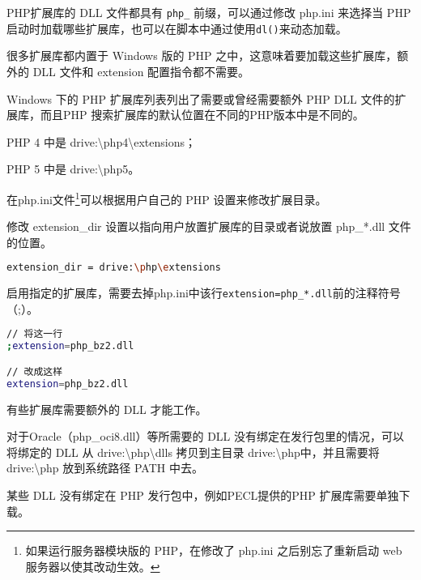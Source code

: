 PHP扩展库的 DLL 文件都具有 \texttt{php\_} 前缀，可以通过修改 php.ini 来选择当 PHP 启动时加载哪些扩展库，也可以在脚本中通过使用\texttt{dl()}来动态加载。



很多扩展库都内置于 Windows 版的 PHP 之中，这意味着要加载这些扩展库，额外的 DLL 文件和 extension 配置指令都不需要。

Windows 下的 PHP 扩展库列表列出了需要或曾经需要额外 PHP DLL 文件的扩展库，而且PHP 搜索扩展库的默认位置在不同的PHP版本中是不同的。

\begin{compactitem}
\item PHP 4 中是 drive:{\textbackslash}php4{\textbackslash}extensions；
\item PHP 5 中是 drive:{\textbackslash}php5。
\end{compactitem}

在php.ini文件\footnote{如果运行服务器模块版的 PHP，在修改了 php.ini 之后别忘了重新启动 web 服务器以使其改动生效。}可以根据用户自己的 PHP 设置来修改扩展目录。 


\begin{compactitem}
\item 修改 extension\_dir 设置以指向用户放置扩展库的目录或者说放置 php\_*.dll 文件的位置。

\begin{lstlisting}[language=bash]
extension_dir = drive:\php\extensions
\end{lstlisting}

\item 启用指定的扩展库，需要去掉php.ini中该行\texttt{extension=php\_*.dll}前的注释符号（;）。

\begin{lstlisting}[language=bash]
// 将这一行
;extension=php_bz2.dll

// 改成这样
extension=php_bz2.dll
\end{lstlisting}

\item 有些扩展库需要额外的 DLL 才能工作。

对于Oracle（php\_oci8.dll）等所需要的 DLL 没有绑定在发行包里的情况，可以将绑定的 DLL 从 drive:{\textbackslash}php{\textbackslash}dlls 拷贝到主目录 drive:{\textbackslash}php中，并且需要将 drive:{\textbackslash}php 放到系统路径 PATH 中去。

\item 某些 DLL 没有绑定在 PHP 发行包中，例如PECL提供的PHP 扩展库需要单独下载。
\end{compactitem}

